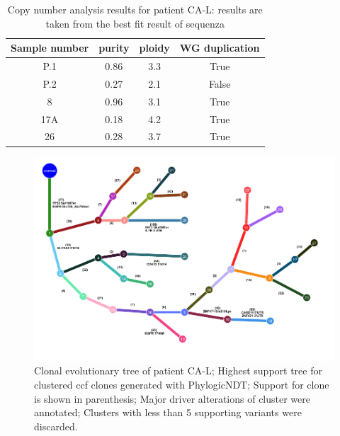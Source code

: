 \begin{table}[ht]
\caption[Copy number analysis results for patient CA-L]{Copy number analysis results for patient CA-L: results are taken from the best fit result of sequenza}\label{tab:ca86cnv}
\centering
{}
\begin{tabular}{|c|c|c|c|}
\toprule
\hline
 \rowcolor{gray!50}
\textbf{Sample number} & \textbf{purity} & \textbf{ploidy} & \textbf{WG duplication}\\
\hline
 P.1 & \num{0.86} &	 \num{3.3}  & True	\\
 P.2 & \num{0.27} & \num{2.1}  & False \\
 8 & \num{0.96} & \num{3.1}  & True \\
 17A & \num{0.18} & \num{4.2}  & True \\
 26 & \num{0.28} & \num{3.7} & True \\
 \hline
\bottomrule
\end{tabular}
\end{table} 


\begin{figure}[ht]
\centering
\includegraphics[width=.99\linewidth]{Figures/CASCADE/CA86/CA86.clonaltree.pdf}
\caption[Clonal evolutionary tree CA-L]{Clonal evolutionary tree of patient CA-L; Highest support tree for clustered ccf clones generated with PhylogicNDT; Support for clone is shown in parenthesis; Major driver alterations of cluster were annotated; Clusters with less than 5 supporting variants were discarded.} \label{fig:ca86.clonalTree}
\end{figure}

